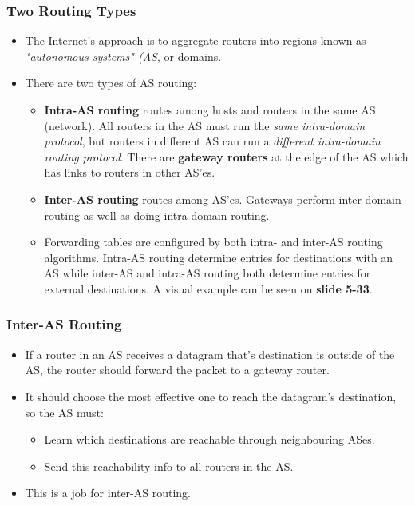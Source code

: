 \documentclass{article}
\begin{document}
\subsubsection{Two Routing Types}
\begin{itemize}
\item The Internet's approach is to aggregate routers into regions known as \emph{"autonomous systems" (AS}, or domains.
\item There are two types of AS routing:
\begin{itemize}
\item {\bf Intra-AS routing} routes among hosts and routers in the same AS (network). All routers in the AS must run the \emph{same intra-domain protocol}, but routers in different AS can run a \emph{different intra-domain routing protocol}. There are {\bf gateway routers} at the edge of the AS which has links to routers in other AS'es.
\item {\bf Inter-AS routing} routes among AS'es. Gateways perform inter-domain routing as well as doing intra-domain routing.
\item Forwarding tables are configured by both intra- and inter-AS routing algorithms. Intra-AS routing determine entries for destinations with an AS while inter-AS and intra-AS routing both determine entries for external destinations. A visual example can be seen on {\bf slide 5-33}.
\end{itemize}
\end{itemize}

\subsubsection{Inter-AS Routing}
\begin{itemize}
\item If a router in an AS receives a datagram that's destination is outside of the AS, the router should forward the packet to a gateway router.
\item It should choose the most effective one to reach the datagram's destination, so the AS must:
\begin{itemize}
\item Learn which destinations are reachable through neighbouring ASes.
\item Send this reachability info to all routers in the AS.
\end{itemize}
\item This is a job for inter-AS routing.
\end{itemize}
\end{document}
